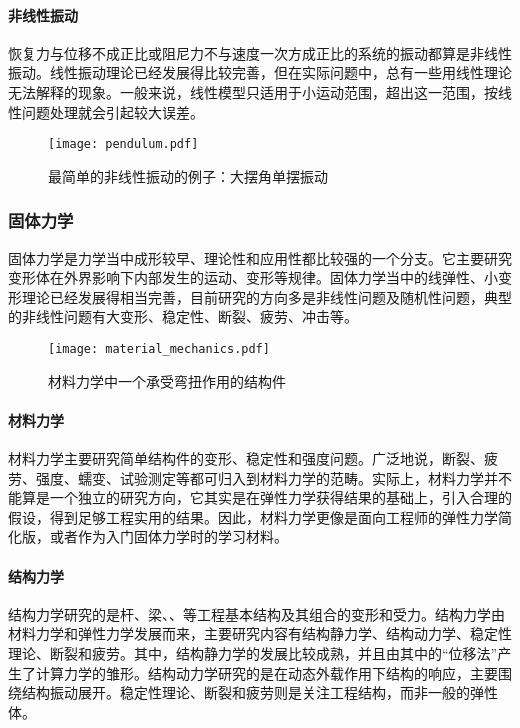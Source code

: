 \paragraph{非线性振动}

恢复力与位移不成正比或阻尼力不与速度一次方成正比的系统的振动都算是非线性振动。线性振动理论已经发展得比较完善，但在实际问题中，总有一些用线性理论无法解释的现象。一般来说，线性模型只适用于小运动范围，超出这一范围，按线性问题处理就会引起较大误差。

\begin{figure}
    \centering
    \texttt{[image: pendulum.pdf]}
    \caption{最简单的非线性振动的例子：大摆角单摆振动}
\end{figure}


\subsubsection{固体力学}

固体力学是力学当中成形较早、理论性和应用性都比较强的一个分支。它主要研究变形体在外界影响下内部发生的运动、变形等规律。固体力学当中的线弹性、小变形理论已经发展得相当完善，目前研究的方向多是非线性问题及随机性问题，典型的非线性问题有大变形、稳定性、断裂、疲劳、冲击等。


\begin{wrapfigure}[9]{r}{5cm}
    \texttt{[image: material\_mechanics.pdf]}
    \caption{材料力学中一个承受弯扭作用的结构件}
\end{wrapfigure}
\paragraph{材料力学} 材料力学主要研究简单结构件的变形、稳定性和强度问题。广泛地说，断裂、疲劳、强度、蠕变、试验测定等都可归入到材料力学的范畴。实际上，材料力学并不能算是一个独立的研究方向，它其实是在弹性力学获得结果的基础上，引入合理的假设，得到足够工程实用的结果。因此，材料力学更像是面向工程师的弹性力学简化版，或者作为入门固体力学时的学习材料。


\paragraph{结构力学}



结构力学研究的是杆、梁、、等工程基本结构及其组合的变形和受力。结构力学由材料力学和弹性力学发展而来，主要研究内容有结构静力学、结构动力学、稳定性理论、断裂和疲劳。其中，结构静力学的发展比较成熟，并且由其中的“位移法”产生了计算力学的雏形。结构动力学研究的是在动态外载作用下结构的响应，主要围绕结构振动展开。稳定性理论、断裂和疲劳则是关注工程结构，而非一般的弹性体。

